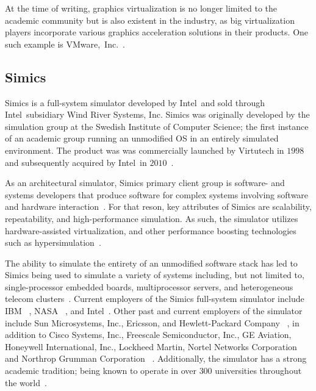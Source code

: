 At the time of writing, graphics virtualization is no longer limited to the academic community but is also existent in the industry, as big virtualization players incorporate various graphics acceleration solutions in their products.
One such example is VMware,~Inc.~.

\subsection{Simics}
\label{sec:simics}

\vspace{5cm}

Simics is a full-system simulator developed by Intel\circledR\ and sold through Intel\circledR\ subsidiary Wind River Systems, Inc.
Simics was originally developed by the simulation group at the Swedish Institute of Computer Science; the first instance of an academic group running an unmodified OS in an entirely simulated environment.
The product was was commercially launched by Virtutech in $1998$~ and subsequently acquired by Intel\circledR\ in $2010$~.

As an architectural simulator, Simics primary client group is software- and systems developers that produce software for complex systems involving software and hardware interaction~.
For that reson, key attributes of Simics are scalability, repeatability, and high-performance simulation.
As such, the simulator utilizes hardware-assisted virtualization, and other performance boosting technologies such as hypersimulation~.

The ability to simulate the entirety of an unmodified software stack has led to Simics being used to simulate a variety of systems including, but not limited to, single-processor embedded boards, multiprocessor servers, and heterogeneous telecom clusters~.
Current employers of the Simics full-system simulator include IBM ~, NASA ~, and Intel\circledR ~.
Other past and current employers of the simulator include Sun Microsystems, Inc., Ericsson, and Hewlett-Packard Company ~, in addition to Cisco Systems, Inc., Freescale Semiconductor, Inc., GE Aviation, Honeywell International, Inc., Lockheed Martin, Nortel Networks Corporation and Northrop Grumman Corporation ~.
Additionally, the simulator has a strong academic tradition; being known to operate in over $300$ universities throughout the world~.


